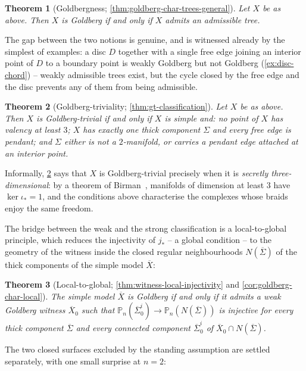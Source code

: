 \documentclass[reqno]{amsart}
\newtheorem{theorem}{Theorem}[section]
\theoremstyle{definition}
\newcommand{\PB}{\mathbb{P}}
\renewcommand{\bar}{\overline}
\numberwithin{equation}{section}
\begin{document}
\begin{theorem}[Goldbergness;
\cref{thm:goldberg-char-trees-general}]\label{thm:main-strong-intro}
Let \(X\) be as above. Then
\(X\) is Goldberg if and only if \(X\) admits an admissible tree.
\end{theorem}

The gap between the two notions is genuine, and is witnessed
already by the simplest of examples: a disc \(D\) together with
a single free edge joining an interior point of \(D\) to a
boundary point is weakly Goldberg but not Goldberg
(\cref{ex:disc-chord}) -- weakly admissible trees exist, but
the cycle closed by the free edge and the disc prevents any of
them from being admissible.

\begin{theorem}[Goldberg-triviality;
\cref{thm:gt-classification}]\label{thm:main-gt-intro}
Let \(X\) be as above. Then
\(X\) is Goldberg-trivial if and only if \(X\) is
simple and: no point of \(X\) has valency at least \(3\); \(X\)
has exactly one thick component \(\Sigma\) and every free edge
is pendant; and \(\Sigma\) either is not a \(2\)-manifold, or
carries a pendant edge attached at an interior point.
\end{theorem}

Informally, \cref{thm:main-gt-intro} says that \(X\) is
Goldberg-trivial precisely when it is \emph{secretly
three-dimensional}: by a theorem of
Birman~\cite[Thm.~1]{Birman1969}, manifolds of dimension at
least \(3\) have \(\ker\iota_\ast=1\), and the conditions above
characterise the complexes whose braids enjoy the same freedom.

The bridge between the weak and the strong classification is a
local-to-global principle, which reduces the injectivity of
\(j_\ast\) -- a global condition -- to the geometry of the
witness inside the closed regular neighbourhoods \(N(\bar\Sigma)\) of
the thick components of the simple model \(\bar X\):

\begin{theorem}[Local-to-global;
\cref{thm:witness-local-injectivity} and
\cref{cor:goldberg-char-local}]\label{thm:main-local-intro}
The simple model \(\bar X\) is Goldberg if and only if it admits
a weak Goldberg witness \(\bar X_0\) such that
\(\PB_n(\bar\Sigma_0^i)\to\PB_n(N(\bar\Sigma))\) is injective
for every thick component \(\bar\Sigma\) and every connected
component \(\bar\Sigma_0^i\) of \(\bar X_0\cap N(\bar\Sigma)\).
\end{theorem}

The two closed surfaces excluded by the standing assumption
are settled separately, with one small surprise at \(n=2\):
\end{document}
